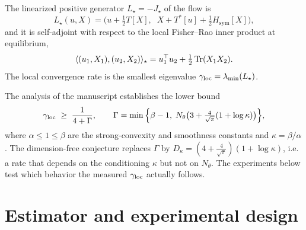 \documentclass[11pt]{article}
\begin{document}
\begin{proposition}\label{prop:Lstar}
The linearized positive generator $L_\star=-J_\star$ of the flow is
\begin{equation}
L_\star(u,X)=\Big(u+\tfrac12 T[X],\;\; X+T^\ast[u]+\tfrac12 H_{\mathrm{sym}}[X]\Big),
\end{equation}
and it is self-adjoint with respect to the local Fisher--Rao inner product at
equilibrium,
\begin{equation*}
\langle(u_1,X_1),(u_2,X_2)\rangle_\star=u_1^\top u_2+\tfrac12\operatorname{Tr}(X_1X_2).
\end{equation*}
The local convergence rate is the smallest eigenvalue
$\gamma_{\mathrm{loc}}=\lambda_{\min}(L_\star)$.
\end{proposition}

The analysis of the manuscript establishes the lower bound
\begin{equation}\label{eq:bound}
\gamma_{\mathrm{loc}}\;\ge\;\frac{1}{4+\Gamma},
\qquad
\Gamma=\min\Big\{\beta-1,\;N_\theta\big(3+\tfrac{4}{\sqrt\pi}(1+\log\kappa)\big)\Big\},
\end{equation}
where $\alpha\le 1\le\beta$ are the strong-convexity and smoothness constants and
$\kappa=\beta/\alpha$. The dimension-free conjecture replaces $\Gamma$ by
$D_\kappa=(4+\tfrac{4}{\sqrt\pi})(1+\log\kappa)$, i.e. a rate that depends on the
conditioning $\kappa$ but not on $N_\theta$. The experiments below test which
behavior the measured $\gamma_{\mathrm{loc}}$ actually follows.

\section{Estimator and experimental design}
\end{document}
